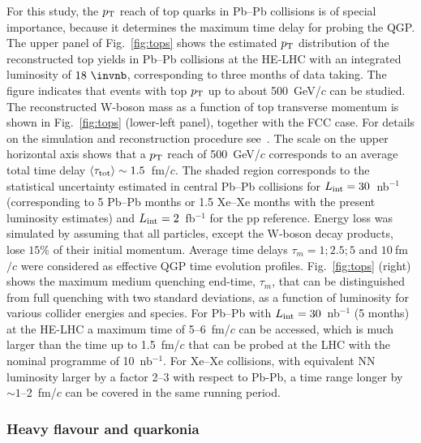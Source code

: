 \documentclass[../report.tex]{subfiles}
\begin{document}
For this study, the $p_{\rm T}$ reach of top quarks in Pb--Pb collisions is of special importance, because it determines the maximum time delay for probing the QGP.
The upper panel of Fig.~\ref{fig:tops} shows the estimated $p_{\rm T}$ distribution
of the reconstructed top yields in Pb--Pb collisions at the HE-LHC with an integrated luminosity of $18~\invnb$, corresponding to three months of data taking. The figure indicates that events with top $p\sb{\scriptstyle\mathrm{T}}$ up to about 500~GeV/$c$ can be studied. 
The reconstructed W-boson mass as a function of top transverse
momentum is shown in Fig.~\ref{fig:tops}
(lower-left panel), together with the FCC case. For details on the simulation and reconstruction procedure
see~\cite{Apolinario:2017sob}. The scale on the upper horizontal axis shows that a $p\sb{\scriptstyle\mathrm{T}}$ reach of 500~GeV/$c$ corresponds to an average total time delay $\langle\tau_{\rm tot}\rangle\sim 1.5$~fm/$c$.
The shaded region corresponds to the statistical uncertainty estimated in central Pb--Pb collisions for
$L_{\rm int} = 30$~nb$^{-1}$ (corresponding to 5 Pb--Pb months or 1.5 Xe--Xe months with the present luminosity estimates)
and $L_{\rm int} = 2$~fb$^{-1}$ for the pp reference.
Energy loss was simulated by assuming that all particles, except the W-boson decay products, lose $15\%$ of their initial momentum. 
Average time delays $\tau_m = 1; 2.5; 5$ and $10~$fm$/c$ were considered as effective QGP time evolution profiles. 
Fig.~\ref{fig:tops} (right) shows the maximum medium quenching
end-time, $\tau_m$, that can be distinguished from full quenching with
two standard deviations, as a function of luminosity for various
collider energies and species. For Pb--Pb with $L_{\rm int}=30$~nb$^{-1}$ (5 months) 
at the HE-LHC a maximum time of 5--6~fm/$c$ can be accessed, which is much
larger than the time up to 1.5~fm/$c$ that can be probed at the LHC with the nominal programme of 
10~nb$^{-1}$. For Xe--Xe collisions, with equivalent NN luminosity larger by a factor 2--3 with respect to Pb-Pb, 
a time range longer by $\sim 1$--2~fm/$c$ can be covered in the same running period.


\subsubsection{Heavy flavour and quarkonia}
\label{sec:HE_hf}
\end{document}
